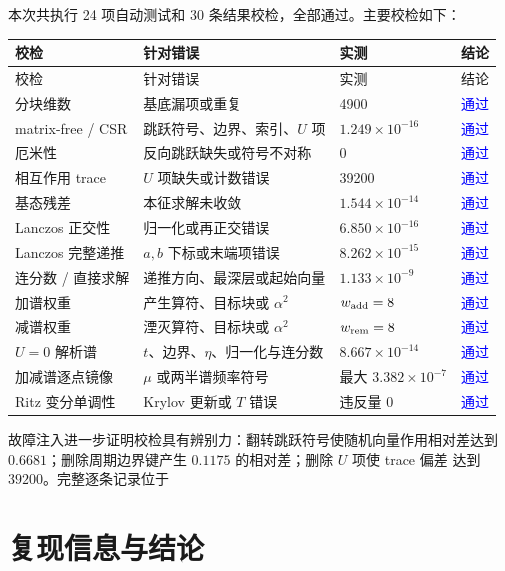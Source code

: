 \documentclass[UTF8,a4paper,11pt,fontset=windows]{ctexart}
\newcommand{\good}{\textcolor{blue}{通过}}
\begin{document}
本次共执行 24 项自动测试和 30 条结果校检，全部通过。主要校检如下：

\begin{longtable}{p{4.2cm}p{4.5cm}p{3.2cm}p{1.6cm}}
\toprule
校检 & 针对错误 & 实测 & 结论 \\
\midrule
\endfirsthead
\toprule
校检 & 针对错误 & 实测 & 结论 \\
\midrule
\endhead
分块维数 & 基底漏项或重复 & 4900 & \good \\
matrix-free / CSR & 跳跃符号、边界、索引、$U$ 项 & $1.249\times10^{-16}$ & \good \\
厄米性 & 反向跳跃缺失或符号不对称 & 0 & \good \\
相互作用 trace & $U$ 项缺失或计数错误 & 39200 & \good \\
基态残差 & 本征求解未收敛 & $1.544\times10^{-14}$ & \good \\
Lanczos 正交性 & 归一化或再正交错误 & $6.850\times10^{-16}$ & \good \\
Lanczos 完整递推 & $a,b$ 下标或末端项错误 & $8.262\times10^{-15}$ & \good \\
连分数 / 直接求解 & 递推方向、最深层或起始向量 & $1.133\times10^{-9}$ & \good \\
加谱权重 & 产生算符、目标块或 $\alpha^2$ & $w_{\rm add}=8$ & \good \\
减谱权重 & 湮灭算符、目标块或 $\alpha^2$ & $w_{\rm rem}=8$ & \good \\
$U=0$ 解析谱 & $t$、边界、$\eta$、归一化与连分数 & $8.667\times10^{-14}$ & \good \\
加减谱逐点镜像 & $\mu$ 或两半谱频率符号 & 最大 $3.382\times10^{-7}$ & \good \\
Ritz 变分单调性 & Krylov 更新或 $T$ 错误 & 违反量 0 & \good \\
\bottomrule
\end{longtable}

故障注入进一步证明校检具有辨别力：翻转跳跃符号使随机向量作用相对差达到
$0.6681$；删除周期边界键产生 $0.1175$ 的相对差；删除 $U$ 项使 trace 偏差
达到 $39200$。完整逐条记录位于
\begin{center}
\end{center}

\section{复现信息与结论}
\end{document}
